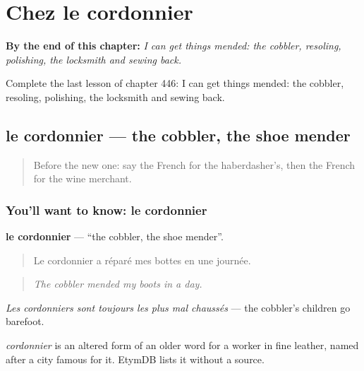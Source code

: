 
\chapter{Chez le cordonnier}
\label{ch:fr-chez-le-cordonnier}

\begin{chapteropening}
\textbf{By the end of this chapter:} \emph{I can get things mended: the cobbler, resoling, polishing, the locksmith and sewing back.}

Complete the last lesson of chapter 446: I can get things mended: the cobbler, resoling, polishing, the locksmith and sewing back.
\end{chapteropening}

\section[le cordonnier]{le cordonnier — the cobbler, the shoe mender}

\label{lesson:FR-C446-cordonnier}



\begin{quote}
Before the new one: say the French for the haberdasher’s, then the French for the wine merchant.
\end{quote}

\subsection*{You'll want to know: le cordonnier}
\textbf{le cordonnier} — \textquotedblleft{}the cobbler, the shoe mender\textquotedblright{}.

\begin{quote}
Le cordonnier a réparé mes bottes en une journée.
\end{quote}

\begin{quote}
\emph{The cobbler mended my boots in a day.}
\end{quote}

\emph{Les cordonniers sont toujours les plus mal chaussés} — the cobbler's children go barefoot.

\begin{cousinweb}
\emph{cordonnier} is an altered form of an older word for a worker in fine leather, named after a city famous for it. EtymDB lists it without a source.
\end{cousinweb}


